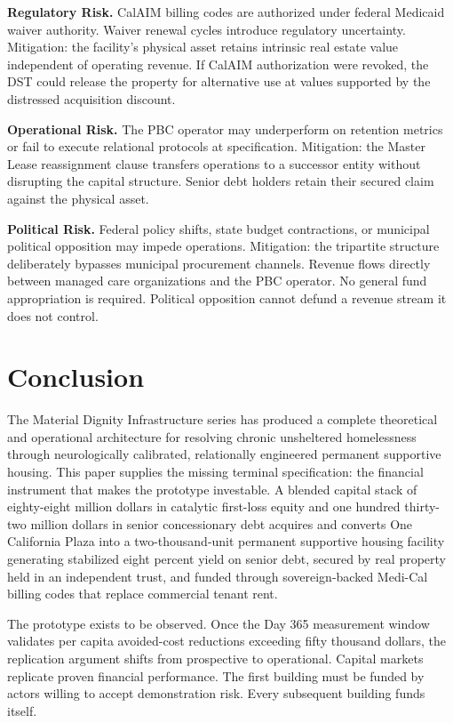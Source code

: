 \documentclass[12pt, letterpaper]{article}
\begin{document}
\textbf{Regulatory Risk.} CalAIM billing codes are authorized under federal Medicaid waiver authority. Waiver renewal cycles introduce regulatory uncertainty. Mitigation: the facility's physical asset retains intrinsic real estate value independent of operating revenue. If CalAIM authorization were revoked, the DST could release the property for alternative use at values supported by the distressed acquisition discount.

\textbf{Operational Risk.} The PBC operator may underperform on retention metrics or fail to execute relational protocols at specification. Mitigation: the Master Lease reassignment clause transfers operations to a successor entity without disrupting the capital structure. Senior debt holders retain their secured claim against the physical asset.

\textbf{Political Risk.} Federal policy shifts, state budget contractions, or municipal political opposition may impede operations. Mitigation: the tripartite structure deliberately bypasses municipal procurement channels. Revenue flows directly between managed care organizations and the PBC operator. No general fund appropriation is required. Political opposition cannot defund a revenue stream it does not control.

\clearpage
\section{Conclusion}

The Material Dignity Infrastructure series has produced a complete theoretical and operational architecture for resolving chronic unsheltered homelessness through neurologically calibrated, relationally engineered permanent supportive housing. This paper supplies the missing terminal specification: the financial instrument that makes the prototype investable. A blended capital stack of eighty-eight million dollars in catalytic first-loss equity and one hundred thirty-two million dollars in senior concessionary debt acquires and converts One California Plaza into a two-thousand-unit permanent supportive housing facility generating stabilized eight percent yield on senior debt, secured by real property held in an independent trust, and funded through sovereign-backed Medi-Cal billing codes that replace commercial tenant rent.

The prototype exists to be observed. Once the Day 365 measurement window validates per capita avoided-cost reductions exceeding fifty thousand dollars, the replication argument shifts from prospective to operational. Capital markets replicate proven financial performance. The first building must be funded by actors willing to accept demonstration risk. Every subsequent building funds itself.
\end{document}
